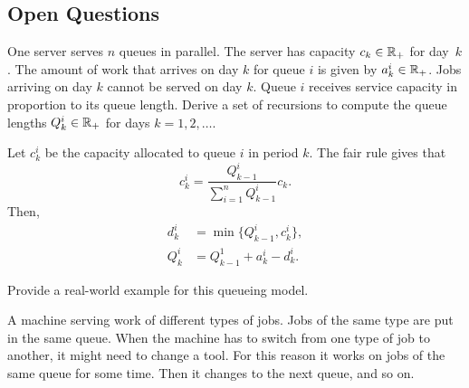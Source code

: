 \subsection{Open Questions}


\begin{exercise}[201704] 
One server serves $n$ queues in parallel. The
 server has capacity $c_k\in \mathbb{R}_+$ for day~$k$. The amount of work
 that arrives on day $k$ for queue $i$ is given by $a_k^i\in \mathbb{R}_+$.
 Jobs arriving on day $k$ cannot be served on day $k$. Queue $i$
 receives service capacity in proportion to its queue length. Derive
 a set of recursions to compute the queue lengths $Q_k^i \in \mathbb{R}_+$ for days $k=1,2,\ldots$. 
\begin{solution}
 Let $c_k^i$ be the capacity allocated to queue $i$ in period $k$. The fair rule gives that 
 \begin{equation*}
 c_k^i = \frac{Q_{k-1}^i}{\sum_{i=1}^n Q_{k-1}^i } c_k.
 \end{equation*}
Then, 
\begin{equation*}
 \begin{split}
 d_k^i &= \min\{Q_{k-1}^i, c^i_k\}, \\
Q_k^i &= Q_{k-1}^1+a_k^i - d_k^i.
 \end{split}
\end{equation*}
\end{solution}
 \end{exercise}

\begin{exercise}[201704]
 Provide a real-world example for this queueing model.
\begin{solution}
A machine serving work of different types of jobs. Jobs of the same type are put in the same queue. When the machine has to switch from one type of job to another, it might need to change a tool. For this reason it works on jobs of the same queue for some time. Then it changes to the next queue, and so on. 
\end{solution}
\end{exercise}


